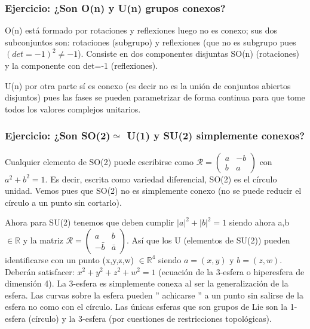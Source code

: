 \documentclass{article}
\begin{document}
     \subsubsection{Ejercicio: ¿Son O(n) y U(n) grupos conexos?}

     O(n) está formado por rotaciones y reflexiones luego no es conexo; sus dos subconjuntos son: rotaciones (subgrupo) y reflexiones (que no es subgrupo pues $(det=-1)^2 \neq -1$). Consiste en dos componentes disjuntas SO(n) (rotaciones) y la componente con det=-1 (reflexiones).

     \smallskip
     U(n) por otra parte sí es conexo (es decir no es la unión de conjuntos abiertos disjuntos) pues las fases se pueden parametrizar de forma continua para que tome todos los valores complejos unitarios.

     \subsubsection{Ejercicio: ¿Son SO(2)$\simeq $
     U(1) y SU(2) simplemente conexos?}

     Cualquier elemento de SO(2) puede escribirse como $\mathcal{R}= \left ( \begin{array}{cc}
         a &  -b\\
         b & a
     \end{array}\right)$ con $a^2+b^2=1$. Es decir, escrita como variedad diferencial, SO(2) es el círculo unidad. Vemos pues que SO(2) no es simplemente conexo (no se puede reducir el círculo a un punto sin cortarlo).

     \bigskip
     Ahora para SU(2) tenemos que deben cumplir $|a|^2+|b|^2=1$ siendo ahora a,b $\in \mathds{R}$ y la matriz $\mathcal{R}= \left ( \begin{array}{cc}
         a &  b\\
         -\bar{b} & \bar{a}
     \end{array}\right)$. Así que los U (elementos de SU(2)) pueden identificarse con un punto (x,y,z,w) $\in \mathds{R}^4$ siendo $a=(x,y)$ y $b=(z,w)$. Deberán satisfacer: $x^2 +y^2 + z^2 + w^2=1$ (ecuación de la 3-esfera o hiperesfera de dimensión 4). La 3-esfera es simplemente conexa al ser la generalización de la esfera. Las curvas sobre la esfera pueden '' achicarse '' a un punto sin salirse de la esfera no como con el círculo. Las únicas esferas que son grupos de Lie son la 1-esfera (círculo) y la 3-esfera (por cuestiones de restricciones topológicas).

     \newpage
\end{document}
